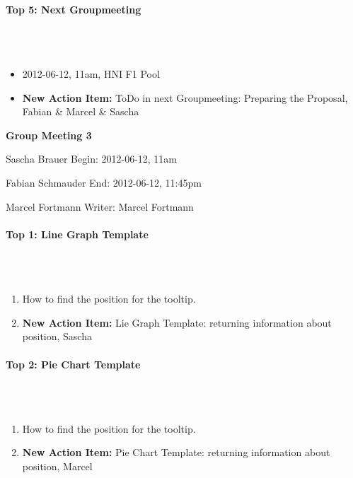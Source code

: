 \documentclass{scrartcl}
\begin{document}
\paragraph{Top 5: Next Groupmeeting}
\hfill \\ \hfill \\
\begin{itemize}
\item 2012-06-12, 11am, HNI F1 Pool
\item \textbf{New Action Item:} ToDo in next Groupmeeting: Preparing the Proposal, Fabian \& Marcel \& Sascha
\end {itemize}

\clearpage

\begin{center}
{\huge \textbf{Group Meeting 3}}\\
\end{center}
\begin{description}
\item Sascha Brauer \hfill Begin: 2012-06-12, 11am 
\item Fabian Schmauder \hfill End: 2012-06-12, 11:45pm
\item Marcel Fortmann \hfill Writer: Marcel Fortmann
\end{description}

\paragraph{Top 1: Line Graph Template}
\hfill \\ \hfill \\
\begin {enumerate}
\item How to find the position for the tooltip. 
\item  \textbf{New Action Item:} Lie Graph Template: returning information about position, Sascha 
\end {enumerate}

\paragraph{Top 2: Pie Chart Template}
\hfill \\ \hfill \\
\begin {enumerate}
\item How to find the position for the tooltip. 
\item  \textbf{New Action Item:} Pie Chart Template: returning information about position, Marcel 
\end {enumerate}
\end{document}
